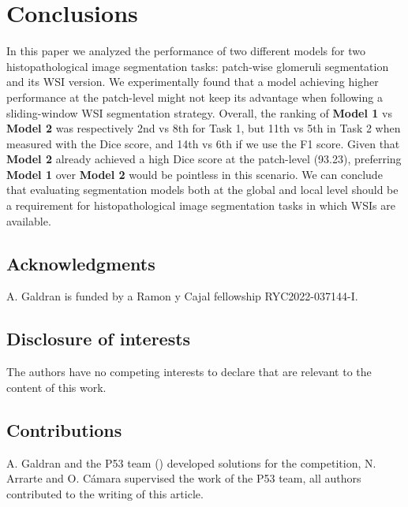 \section{Conclusions}
In this paper we analyzed the performance of two different models for two histopathological image segmentation tasks: patch-wise glomeruli segmentation and its WSI version. 
We experimentally found that a model achieving higher performance at the patch-level might not keep its advantage when following a sliding-window WSI segmentation strategy. 
Overall, the ranking of \textbf{Model 1} vs \textbf{Model 2} was respectively 2nd vs 8th for Task 1, but 11th vs 5th in Task 2 when measured with the Dice score, and 14th vs 6th if we use the F1 score.
Given that \textbf{Model 2} already achieved a high Dice score at the patch-level (93.23), preferring \textbf{Model 1} over \textbf{Model 2} would be pointless in this scenario. 
We can conclude that evaluating segmentation models both at the global and local level should be a requirement for histopathological image segmentation tasks in which WSIs are available.


\subsection*{Acknowledgments}
A. Galdran is funded by a Ramon y Cajal fellowship RYC2022-037144-I.

\subsection*{Disclosure of interests}
The authors have no competing interests to declare that are relevant to the content of this work.

 \subsection*{Contributions}
A. Galdran and the P53 team () developed solutions for the competition, N. Arrarte and O. Cámara supervised the work of the P53 team, all authors contributed to the writing of this article.


